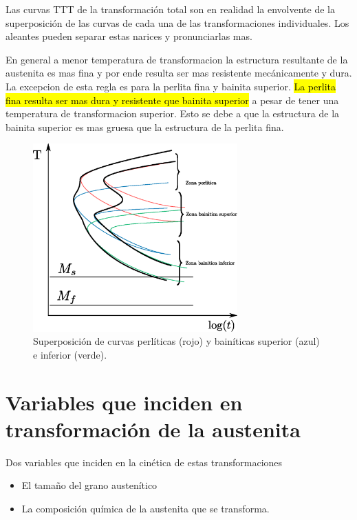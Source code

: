 Las curvas TTT de la transformación total son en realidad la envolvente de la superposición de las curvas de cada una de las transformaciones individuales. Los aleantes pueden separar estas narices y pronunciarlas mas.

En general a menor temperatura de transformacion la estructura resultante de la austenita es mas fina y por ende resulta ser mas resistente mecánicamente y dura. La excepcion de esta regla es para la perlita fina y bainita superior. \hl{La perlita fina resulta ser mas dura y resistente que bainita superior} a pesar de tener una temperatura de transformacion superior. Esto se debe a que la estructura de la bainita superior es mas gruesa que la estructura de la perlita fina.

\begin{figure}[htb!]
    \centering
    \includegraphics[width=0.7\textwidth]{fig/TTTsuperpuesta.eps}
    \caption{Superposición de curvas perlíticas (rojo) y bainíticas superior (azul) e inferior (verde).}
    \label{fig:TTTsuperpuestas}
\end{figure}

\section[Transformación de la austenita]{Variables que inciden en transformación de la austenita}
Dos variables que inciden en la cinética de estas transformaciones
\begin{itemize}
    \item El tamaño del grano austenítico
    \item La composición química de la austenita que se transforma.
\end{itemize}

